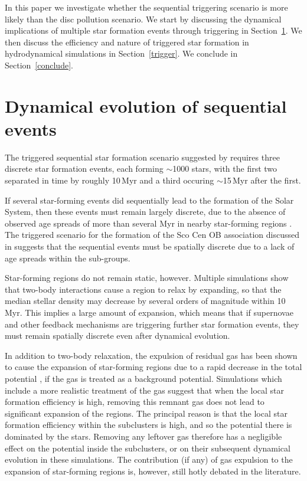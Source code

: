 \documentclass[useAMS,usenatbib,usegraphicx]{mn2e}
\begin{document}
In this paper we investigate whether the sequential triggering scenario is more likely than the disc pollution scenario. We start by discussing the dynamical implications of  multiple star formation events through triggering in Section~\ref{dynamics}. We then discuss the efficiency and nature of triggered star formation in hydrodynamical simulations in Section~\ref{trigger}. We conclude in Section~\ref{conclude}.

\section{Dynamical evolution of sequential events}
\label{dynamics}

The triggered sequential star formation scenario suggested by \citet{Gounelle12} requires three discrete star formation events, each forming $\sim$1000 stars, with the first two separated in time by roughly 10\,Myr and a third occuring $\sim$15\,Myr after the first.   

If several star-forming events did sequentially lead to the formation of the Solar System, then these events must remain largely discrete, due to the absence of observed age spreads of more than several Myr in nearby star-forming regions \citep{Reggiani11b,Jeffries11}. The triggered scenario for the formation of the Sco Cen OB association discussed in \citet{Preibisch07} suggests that the sequential events must be spatially discrete due to  a lack of age spreads within the sub-groups.

Star-forming regions do not remain static, however. Multiple simulations \citep[e.g.][]{Klessen01,Moeckel10,Gieles12,Parker12d,Parker13a} show that two-body interactions cause a region to relax by expanding, so that the median stellar density may decrease by several orders of magnitude within 10\,Myr. This implies a large amount of expansion, which means that if supernovae and other feedback mechanisms are triggering further star formation events, they must remain spatially discrete even after dynamical evolution.

In addition to two-body relaxation, the expulsion of residual gas has been shown to cause the expansion of  star-forming regions due to a rapid decrease in the total potential \citep[e.g.][and many more]{Tutukov78,Hills80,Lada84,Goodwin06,Baumgardt07,Pfalzner14}, if the gas is treated as a background potential. Simulations which include a more realistic treatment of the gas \citep{Offner09,Kruijssen12a,Dale12b} suggest that when the local star formation efficiency is high, removing this remnant gas does not lead to significant expansion of the regions. The principal reason is that the local star formation efficiency within the subclusters is high, and so the potential there is dominated by the stars. Removing any leftover gas therefore has a negligible effect on the potential inside the subclusters, or on their subsequent dynamical evolution in these simulations. The contribution (if any) of gas expulsion to the expansion of star-forming regions is, however, still hotly debated in the literature.
\end{document}
